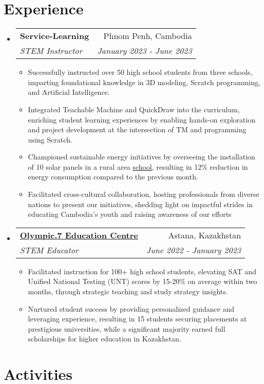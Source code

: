 \documentclass[letterpaper,11pt]{article}
\makeatletter
\newcommand{\resumeItem}[1]{
  \item\small{
    {#1 \vspace{-2pt}}
  }
}
\newcommand{\resumeSubheading}[4]{
  \vspace{-2pt}\item
    \begin{tabular*}{0.97\textwidth}[t]{l@{\extracolsep{\fill}}r}
      \textbf{#1} & #2 \\
      \textit{\small#3} & \textit{\small #4} \\
    \end{tabular*}\vspace{-7pt}
}
\newcommand{\resumeSubHeadingListStart}{\begin{itemize}[leftmargin=0.15in, label={}]}
\newcommand{\resumeSubHeadingListEnd}{\end{itemize}}
\newcommand{\resumeItemListStart}{\begin{itemize}}
\newcommand{\resumeItemListEnd}{\end{itemize}\vspace{-5pt}}
\makeatother
\begin{document}
\section{Experience}
  \resumeSubHeadingListStart
    \resumeSubheading
      {Service-Learning}{Phnom Penh, Cambodia}
      {STEM Instructor}{January 2023 - June 2023}
      \resumeItemListStart
        \resumeItem{Successfully instructed over 50 high school students from three schools, imparting foundational knowledge in 3D modeling, Scratch programming, and Artificial Intelligence.}
        \resumeItem{Integrated Teachable Machine and QuickDraw into the curriculum, enriching student learning experiences by enabling hands-on exploration and project development at the intersection of TM and programming using Scratch.}
        \resumeItem{Championed sustainable energy initiatives by overseeing the installation of 10 solar panels in a rural area \href{https://livingwaterfarm.org/#}{school}, resulting in 12\% reduction in energy consumption compared to the previous month.}
        \resumeItem{Facilitated cross-cultural collaboration, hosting professionals from diverse nations to present our initiatives, shedding light on impactful strides in educating Cambodia's youth and raising awareness of our efforts}
      \resumeItemListEnd

  \resumeSubHeadingListEnd

  \resumeSubHeadingListStart
    \resumeSubheading
      {\href{https://www.instagram.com/olympic.7/}{Olympic.7 Education Centre}}{Astana, Kazakhstan}
      {STEM Educator}{June 2022 - January 2023}
      \resumeItemListStart
        \resumeItem{Facilitated instruction for 100+ high school students, elevating SAT and Unified National Testing (UNT) scores by 15-20\% on average within two months, through strategic teaching and study strategy insights.}
        \resumeItem{Nurtured student success by providing personalized guidance and leveraging experience, resulting in 15 students securing placements at prestigious universities, while a significant majority earned full scholarships for higher education in Kazakhstan.}
      \resumeItemListEnd

  \resumeSubHeadingListEnd

\section{Activities}
\end{document}
